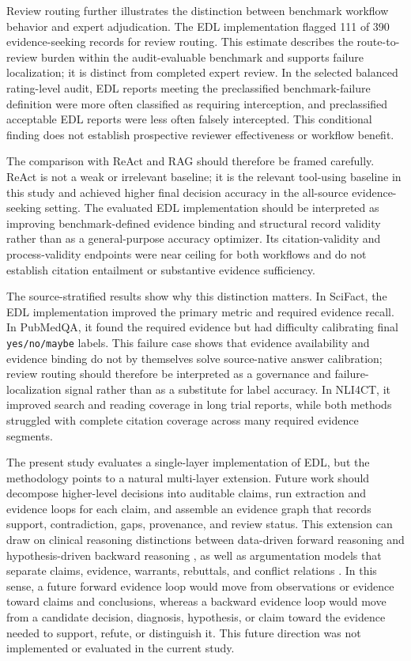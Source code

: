\documentclass[11pt,a4paper]{article}
\begin{document}
Review routing further illustrates the distinction between benchmark workflow behavior and expert adjudication. The EDL implementation flagged 111 of 390 evidence-seeking records for review routing. This estimate describes the route-to-review burden within the audit-evaluable benchmark and supports failure localization; it is distinct from completed expert review. In the selected balanced rating-level audit, EDL reports meeting the preclassified benchmark-failure definition were more often classified as requiring interception, and preclassified acceptable EDL reports were less often falsely intercepted. This conditional finding does not establish prospective reviewer effectiveness or workflow benefit.

The comparison with ReAct and RAG should therefore be framed carefully. ReAct is not a weak or irrelevant baseline; it is the relevant tool-using baseline in this study and achieved higher final decision accuracy in the all-source evidence-seeking setting. The evaluated EDL implementation should be interpreted as improving benchmark-defined evidence binding and structural record validity rather than as a general-purpose accuracy optimizer. Its citation-validity and process-validity endpoints were near ceiling for both workflows and do not establish citation entailment or substantive evidence sufficiency.

The source-stratified results show why this distinction matters. In SciFact, the EDL implementation improved the primary metric and required evidence recall. In PubMedQA, it found the required evidence but had difficulty calibrating final \texttt{yes/no/maybe} labels. This failure case shows that evidence availability and evidence binding do not by themselves solve source-native answer calibration; review routing should therefore be interpreted as a governance and failure-localization signal rather than as a substitute for label accuracy. In NLI4CT, it improved search and reading coverage in long trial reports, while both methods struggled with complete citation coverage across many required evidence segments.

The present study evaluates a single-layer implementation of EDL, but the methodology points to a natural multi-layer extension. Future work should decompose higher-level decisions into auditable claims, run extraction and evidence loops for each claim, and assemble an evidence graph that records support, contradiction, gaps, provenance, and review status. This extension can draw on clinical reasoning distinctions between data-driven forward reasoning and hypothesis-driven backward reasoning \cite{patel1986medicalreasoning,elstein1978medicalproblem}, as well as argumentation models that separate claims, evidence, warrants, rebuttals, and conflict relations \cite{toulmin1958argument,dung1995argumentation}. In this sense, a future forward evidence loop would move from observations or evidence toward claims and conclusions, whereas a backward evidence loop would move from a candidate decision, diagnosis, hypothesis, or claim toward the evidence needed to support, refute, or distinguish it. This future direction was not implemented or evaluated in the current study.
\end{document}
